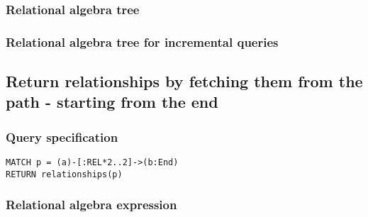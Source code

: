 \subsubsection*{Relational algebra tree}


\subsubsection*{Relational algebra tree for incremental queries}


\subsection{Return relationships by fetching them from the path - starting from the end}

\subsubsection*{Query specification}

\begin{lstlisting}
MATCH p = (a)-[:REL*2..2]->(b:End)
RETURN relationships(p)
\end{lstlisting}

\subsubsection*{Relational algebra expression}

